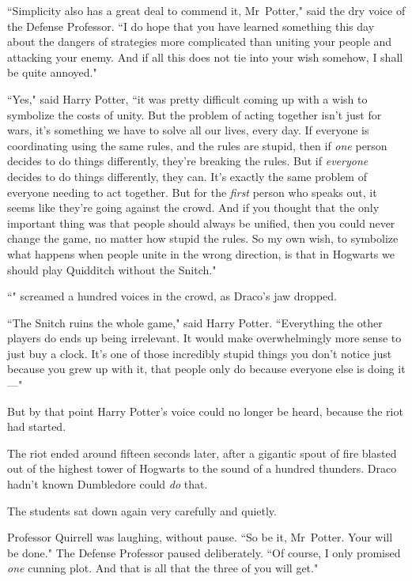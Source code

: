 ``Simplicity also has a great deal to commend it, Mr~Potter," said the dry voice of the Defense Professor. ``I do hope that you have learned something this day about the dangers of strategies more complicated than uniting your people and attacking your enemy. And if all this does not tie into your wish somehow, I shall be quite annoyed."

``Yes," said Harry Potter, ``it was pretty difficult coming up with a wish to symbolize the costs of unity. But the problem of acting together isn't just for wars, it's something we have to solve all our lives, every day. If everyone is coordinating using the same rules, and the rules are stupid, then if \emph{one} person decides to do things differently, they're breaking the rules. But if \emph{everyone} decides to do things differently, they can. It's exactly the same problem of everyone needing to act together. But for the \emph{first} person who speaks out, it seems like they're going against the crowd. And if you thought that the only important thing was that people should always be unified, then you could never change the game, no matter how stupid the rules. So my own wish, to symbolize what happens when people unite in the wrong direction, is that in Hogwarts we should play Quidditch without the Snitch."

``" screamed a hundred voices in the crowd, as Draco's jaw dropped.

``The Snitch ruins the whole game," said Harry Potter. ``Everything the other players do ends up being irrelevant. It would make overwhelmingly more sense to just buy a clock. It's one of those incredibly stupid things you don't notice just because you grew up with it, that people only do because everyone else is doing it—"

But by that point Harry Potter's voice could no longer be heard, because the riot had started.

\later

The riot ended around fifteen seconds later, after a gigantic spout of fire blasted out of the highest tower of Hogwarts to the sound of a hundred thunders. Draco hadn't known Dumbledore could \emph{do} that.

The students sat down again very carefully and quietly.

Professor Quirrell was laughing, without pause. ``So be it, Mr~Potter. Your will be done." The Defense Professor paused deliberately. ``Of course, I only promised \emph{one} cunning plot. And that is all that the three of you will get."

